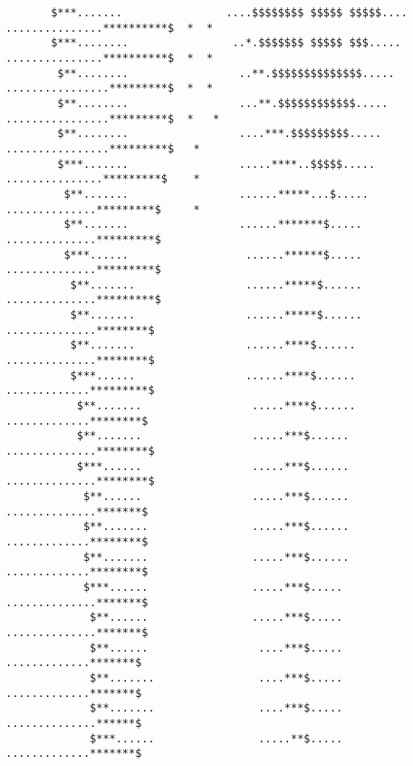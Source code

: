 \begin{verbatim}
       $***.......                ....$$$$$$$$ $$$$$ $$$$$....                   ...............**********$  *  *
       $***........                ..*.$$$$$$$ $$$$$ $$$.....                    ...............**********$  *  *
        $**........                 ..**.$$$$$$$$$$$$$$.....                     ................*********$  *  *
        $**........                 ...**.$$$$$$$$$$$$.....                      ................*********$  *   *
        $**........                 ....***.$$$$$$$$$.....                       ................*********$   *
        $***.......                 .....****..$$$$$.....                        ...............*********$    *
         $**.......                 ......*****...$.....                          ..............*********$     *
         $**.......                 ......*******$.....                           ..............*********$
         $***......                  ......******$.....                           ..............*********$
          $**.......                 ......*****$......                           ..............*********$
          $**.......                 ......*****$......                            ..............********$
          $**.......                 ......****$......                             ..............********$
          $***......                 ......****$......                             .............*********$
           $**.......                 .....****$......                             .............********$
           $**.......                 .....***$......                             ..............********$
           $***......                 .....***$......                             ..............********$
            $**......                 .....***$......                             ..............*******$
            $**.......                .....***$......                             .............********$
            $**.......                .....***$......                             .............********$
            $***......                .....***$.....                             ..............*******$
             $**......                .....***$.....                             ..............*******$
             $**......                 ....***$.....                             .............*******$
             $**.......                ....***$.....                             .............*******$
             $**.......                ....***$.....                            ..............******$
             $***......                .....**$.....                            .............*******$

\end{verbatim}
